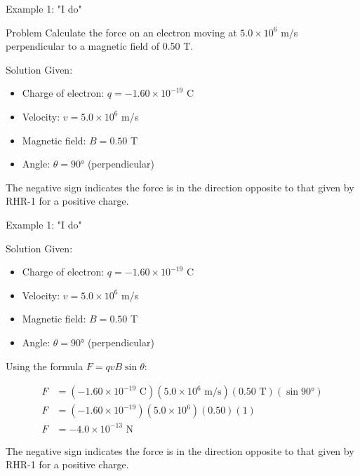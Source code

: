 \documentclass{beamer}
\begin{document}
\begin{frame}{Example 1: "I do"}
\begin{block}{Problem}
Calculate the force on an electron moving at $5.0 \times 10^6$ m/s perpendicular to a magnetic field of 0.50 T.
\end{block}
\pause
\begin{block}{Solution}
Given:
\begin{itemize}
\item Charge of electron: $q = -1.60 \times 10^{-19}$ C
\item Velocity: $v = 5.0 \times 10^6$ m/s
\item Magnetic field: $B = 0.50$ T
\item Angle: $\theta = 90°$ (perpendicular)
\end{itemize}

The negative sign indicates the force is in the direction opposite to that given by RHR-1 for a positive charge.
\end{block}
\end{frame}

\begin{frame}{Example 1: "I do"}

\begin{block}{Solution}
Given:
\begin{itemize}
\item Charge of electron: $q = -1.60 \times 10^{-19}$ C
\item Velocity: $v = 5.0 \times 10^6$ m/s
\item Magnetic field: $B = 0.50$ T
\item Angle: $\theta = 90°$ (perpendicular)
\end{itemize}

Using the formula $F = qvB\sin\theta$:

\pause

\begin{align}
F &= (-1.60 \times 10^{-19} \text{ C})(5.0 \times 10^6 \text{ m/s})(0.50 \text{ T})(\sin 90°) \\
F &= (-1.60 \times 10^{-19})(5.0 \times 10^6)(0.50)(1) \\
F &= -4.0 \times 10^{-13} \text{ N}
\end{align}

The negative sign indicates the force is in the direction opposite to that given by RHR-1 for a positive charge.
\end{block}
\end{frame}
\end{document}
